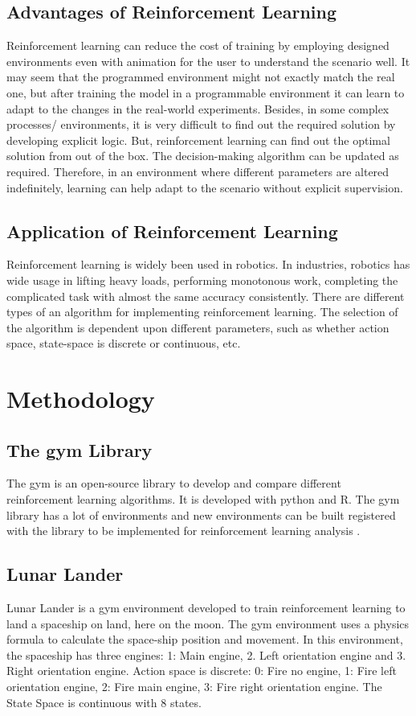 \documentclass[conference]{IEEEtran}
\begin{document}
\subsection{Advantages of Reinforcement Learning}
Reinforcement learning can reduce the cost of training by employing designed environments even with animation for the user to understand the scenario well. It may seem that the programmed environment might not exactly match the real one, but after training the model in a programmable environment it can learn to adapt to the changes in the real-world experiments. Besides, in some complex processes/ environments, it is very difficult to find out the required solution by developing explicit logic. But, reinforcement learning can find out the optimal solution from out of the box. The decision-making algorithm can be updated as required. Therefore, in an environment where different parameters are altered indefinitely, learning can help adapt to the scenario without explicit supervision.

\subsection{Application of Reinforcement Learning}
Reinforcement learning is widely been used in robotics. In industries, robotics has wide usage in lifting heavy loads, performing monotonous work, completing the complicated task with almost the same accuracy consistently. There are different types of an algorithm for implementing reinforcement learning. The selection of the algorithm is dependent upon different parameters, such as whether action space, state-space is discrete or continuous, etc.

\section{Methodology}

\subsection{The gym Library}
The gym is an open-source library to develop and compare different reinforcement learning algorithms. It is developed with python and R. The gym library has a lot of environments and new environments can be built registered with the library to be implemented for reinforcement learning analysis \cite{b9}.

\subsection{Lunar Lander}
Lunar Lander is a gym environment developed to train reinforcement learning to land a spaceship on land, here on the moon. The gym environment uses a physics formula to calculate the space-ship position and movement. In this environment, the spaceship has three engines: 1: Main engine, 2. Left orientation engine and 3. Right orientation engine. Action space is discrete: 0: Fire no engine, 1: Fire left orientation engine, 2: Fire main engine, 3: Fire right orientation engine. The State Space is continuous with 8 states.
\end{document}
